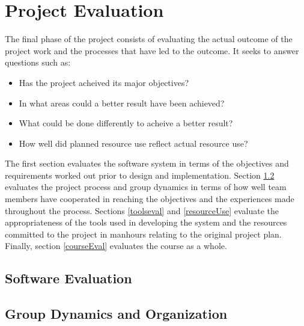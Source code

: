  

\chapter{Project Evaluation}\label{eval}

\minitoc


The final phase of the project consists of evaluating the actual outcome of
the project work and the processes that have led to the outcome. It
seeks to answer questions such as:

\begin{itemize}
\item Has the project acheived its major objectives?
\item In what areas could a better result have been achieved?
\item What could be done differently to acheive a better result?
\item How well did planned resource use reflect actual resource use?
\end{itemize}

The first section evaluates the software system in terms of the
objectives and requirements worked out prior to design and
implementation. Section \ref{groupDyn} evaluates the project process and
group dynamics in terms of how well team members have cooperated in
reaching the objectives and the experiences made throughout the
process. Sections \ref{toolseval} and \ref{resourceUse}
evaluate the appropriateness of the tools used in developing the
system and the resources committed to the project in manhours relating
to the original project plan. Finally, section \ref{courseEval}
evaluates the course as a whole.

\section{Software Evaluation}



\section{Group Dynamics and Organization}\label{groupDyn}

